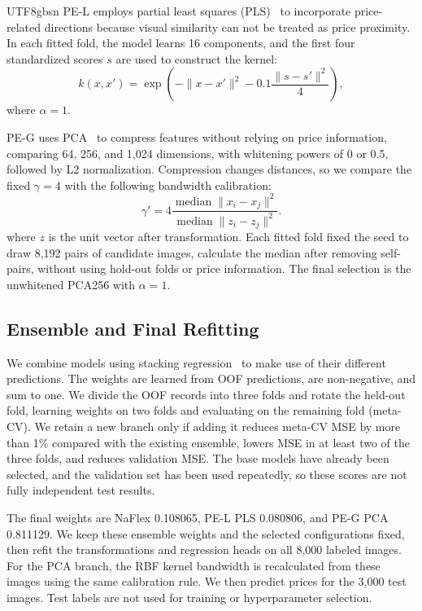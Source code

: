 \documentclass[conference,a4paper]{IEEEtran}
\begin{document}
\begin{CJK*}{UTF8}{gbsn}
PE-L employs partial least squares (PLS)~\cite{pls1966,pls} to incorporate price-related directions because visual similarity can not be treated as price proximity. In each fitted fold, the model learns 16 components, and the first four standardized scores $s$ are used to construct the kernel:
\begin{equation}
 k(x,x')=\exp\left(-\|x-x'\|^2-0.1\frac{\|s-s'\|^2}{4}\right),
\end{equation}
where $\alpha=1$.

PE-G uses PCA~\cite{pca} to compress features without relying on price information, comparing 64, 256, and 1,024 dimensions, with whitening powers of 0 or 0.5, followed by L2 normalization. Compression changes distances, so we compare the fixed $\gamma=4$ with the following bandwidth calibration:
\begin{equation}
 \gamma'=4\frac{\operatorname{median}\|x_i-x_j\|^2}
 {\operatorname{median}\|z_i-z_j\|^2}.
\end{equation}
where $z$ is the unit vector after transformation. Each fitted fold fixed the seed to draw 8,192 pairs of candidate images, calculate the median after removing self-pairs, without using hold-out folds or price information. The final selection is the unwhitened PCA256 with $\alpha=1$.

\subsection{Ensemble and Final Refitting}
We combine models using stacking regression~\cite{stacking} to make use of their different predictions. The weights are learned from OOF predictions, are non-negative, and sum to one. We divide the OOF records into three folds and rotate the held-out fold, learning weights on two folds and evaluating on the remaining fold (meta-CV). We retain a new branch only if adding it reduces meta-CV MSE by more than 1\% compared with the existing ensemble, lowers MSE in at least two of the three folds, and reduces validation MSE. The base models have already been selected, and the validation set has been used repeatedly, so these scores are not fully independent test results.

The final weights are NaFlex 0.108065, PE-L PLS 0.080806, and PE-G PCA 0.811129. We keep these ensemble weights and the selected configurations fixed, then refit the transformations and regression heads on all 8,000 labeled images. For the PCA branch, the RBF kernel bandwidth is recalculated from these images using the same calibration rule. We then predict prices for the 3,000 test images. Test labels are not used for training or hyperparameter selection.


\end{CJK*}
\end{document}
